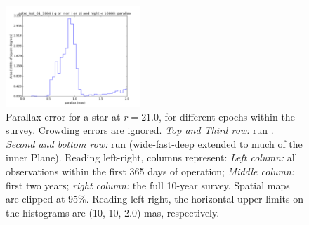 \begin{figure}[ht]
\begin{center}
  \includegraphics[width=2.0in]{./figs/milkyway/astromPanels/MW_Astrom_paError_wfdPlane_10y_hst.png}
  \end{center}
  \caption{Parallax error for a star at $r=21.0$, for different epochs within the survey. Crowding errors are ignored. {\it Top and Third row:} \OpSim run . {\it Second and bottom row:} \OpSim run  (wide-fast-deep extended to much of the inner Plane). Reading left-right, columns represent: {\it Left column:} all observations within the first 365 days of operation; {\it Middle column:} first two years; {\it right column:} the full 10-year survey. Spatial maps are clipped at 95\%.  Reading left-right, the horizontal upper limits on the histograms are (10, 10, 2.0) mas, respectively.}
  \label{fig_astrom_ByTime_paError}
\end{figure}

